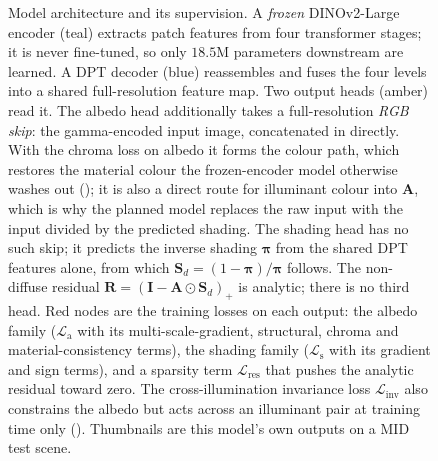 \begin{figure}[p]
{}
  \caption[Model architecture and supervision.]{%
    Model architecture and its supervision. A \emph{frozen} DINOv2-Large encoder (teal)
    extracts patch features from four transformer stages; it is never fine-tuned, so only
    $18.5$M parameters downstream are learned. A DPT decoder (blue)
    reassembles and fuses the four levels into a shared full-resolution feature map. Two
    output heads (amber) read it. The albedo head additionally takes a full-resolution
    \emph{RGB skip}: the gamma-encoded input image, concatenated in directly. With the
    chroma loss on albedo it forms the colour path, which restores the material colour the
    frozen-encoder model otherwise washes out (); it is also a direct
    route for illuminant colour into $\mathbf{A}$, which is why the planned model replaces
    the raw input with the input divided by the predicted shading. The
    shading head has no such skip; it predicts the inverse shading $\boldsymbol{\pi}$ from the
    shared DPT features alone, from which
    $\mathbf{S}_d=(1-\boldsymbol{\pi})/\boldsymbol{\pi}$ follows. The non-diffuse residual
    $\mathbf{R}=(\mathbf{I}-\mathbf{A}\odot\mathbf{S}_d)_{+}$ is analytic; there is no third
    head. Red nodes are the training losses on each output: the albedo family
    ($\mathcal{L}_{\text{a}}$ with its multi-scale-gradient, structural, chroma and
    material-consistency terms), the shading family ($\mathcal{L}_{\text{s}}$ with its
    gradient and sign terms), and a sparsity term $\mathcal{L}_{\text{res}}$ that pushes the
    analytic residual toward zero. The cross-illumination invariance loss $\mathcal{L}_{\text{inv}}$
    also constrains the albedo but acts across an illuminant pair at training time only
    (). Thumbnails are this model's own outputs on a MID test scene.
  }
  \label{fig:architecture}
\end{figure}

